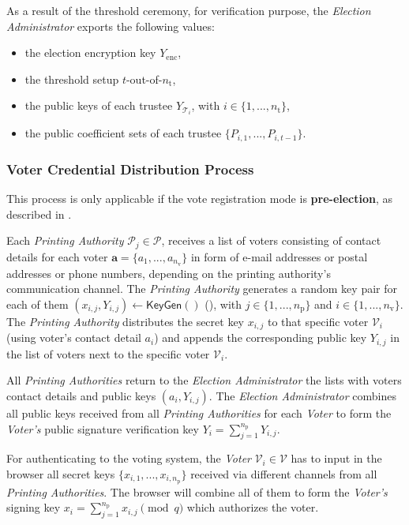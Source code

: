 As a result of the threshold ceremony, for verification purpose, the \textit{Election Administrator} exports the following values:
\begin{itemize}
    \item the election encryption key $Y_\mathrm{enc}$,
    \item the threshold setup $t$-out-of-$n_\mathrm{t}$,
    \item the public keys of each trustee $Y_{\mathcal{T}_i}$, with $i \in \{1, ..., n_\mathrm{t}\}$,
    \item the public coefficient sets of each trustee $\{P_{i,1}, ..., P_{i,t-1}\}$.
\end{itemize}


\subsubsection{Voter Credential Distribution Process} \label{sec: voter credential distribution process}
This process is only applicable if the vote registration mode is \textbf{pre-election}, as described in .

Each \textit{Printing Authority} \( \mathcal{P}_j \in \boldsymbol{\mathcal{P}}\), receives a list of voters consisting of contact details for each voter \( \boldsymbol{a} = \{a_1, ..., a_{n_\mathrm{v}}\} \) in form of e-mail addresses or postal addresses or phone numbers, depending on the printing authority's communication channel. The \textit{Printing Authority} generates a random key pair for each of them \( (x_{i, j}, Y_{i, j}) \leftarrow \mathsf{KeyGen}() \) (), with \( j \in \{ 1, ..., n_\mathrm{p} \} \) and \( i \in \{ 1, ..., n_\mathrm{v} \} \). The \textit{Printing Authority} distributes the secret key $x_{i, j}$ to that specific voter $\mathcal{V}_i$ (using voter's contact detail $a_i$) and appends the corresponding public key $Y_{i, j}$ in the list of voters next to the specific voter $\mathcal{V}_i$.

All \textit{Printing Authorities} return to the \textit{Election Administrator} the lists with voters contact details and public keys $(a_i, Y_{i,j})$. The \textit{Election Administrator} combines all public keys received from all \textit{Printing Authorities} for each \textit{Voter} to form the \textit{Voter's} public signature verification key \( Y_i = \sum_{j=1}^{n_\mathrm{p}} Y_{i, j} \).

For authenticating to the voting system, the \textit{Voter} \( \mathcal{V}_i \in \boldsymbol{\mathcal{V}} \) has to input in the browser all secret keys \( \{x_{i, 1}, ..., x_{i, n_\mathrm{p}}\} \) received via different channels from all \textit{Printing Authorities}. The browser will combine all of them to form the \textit{Voter's} signing key \( x_i = \sum_{j=1}^{n_\mathrm{p}} x_{i, j} \pmod q \) which authorizes the voter.


